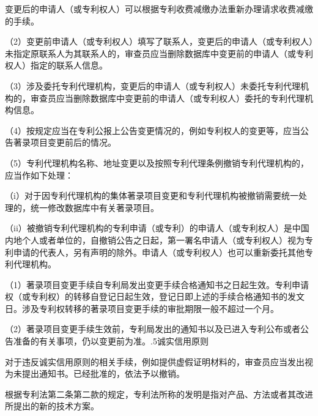 变更后的申请人（或专利权人）可以根据专利收费减缴办法重新办理请求收费减缴的手续。

{\setlength{\parindent}{17.1bp}（2）变更前申请人（或专利权人）填写了联系人，变更后的申请人（或专利权人）未指定原联系人为其联系人的，审查员应当删除数据库中变更前的申请人（或专利权人）指定的联系人信息。\par}

{\setlength{\parindent}{17.1bp}（3）涉及委托专利代理机构，变更后的申请人（或专利权人）未委托专利代理机构的，审查员应当删除数据库中变更前的申请人（或专利权人）委托的专利代理机构信息。\par}

{\setlength{\parindent}{17.1bp}（4）按规定应当在专利公报上公告变更情况的，例如专利权人的变更等，应当公告著录项目变更前后的情况。\par}

{\setlength{\parindent}{17.1bp}（5）专利代理机构名称、地址变更以及按照专利代理条例撤销专利代理机构的，应当作如下处理：\par}

{\setlength{\parindent}{17.1bp}（i）对于因专利代理机构的集体著录项目变更和专利代理机构被撤销需要统一处理的，统一修改数据库中有关著录项目。\par}

{\setlength{\parindent}{17.1bp}（ii）被撤销专利代理机构的专利申请（或专利）的申请人（或专利权人）是中国内地个人或者单位的，自撤销公告之日起，第一署名申请人（或专利权人）视为专利申请的代表人，另有声明的除外。申请人（或专利权人）也可以重新委托其他专利代理机构。\par}

{\setlength{\parindent}{17.1bp}（1）著录项目变更手续自专利局发出变更手续合格通知书之日起生效。专利申请权（或专利权）的转移自登记日起生效，登记日即上述的手续合格通知书的发文日。涉及专利权转移的著录项目变更手续的审批期限一般不超过一个月。\par}

{\setlength{\parindent}{17.1bp}（2）著录项目变更手续生效前，专利局发出的通知书以及已进入专利公布或者公告准备的有关事项，仍以变更前为准。{.5诚实信用原则}\par}

对于违反诚实信用原则的相关手续，例如提供虚假证明材料的，审查员应当发出视为未提出通知书。已经批准的，依法予以撤销。

根据专利法第二条第二款的规定，专利法所称的发明是指对产品、方法或者其改进所提出的新的技术方案。


